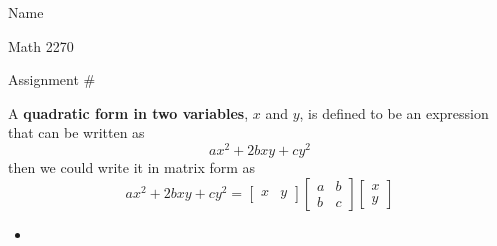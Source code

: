 \documentclass[12pt]{article}
\begin{document}
\hfill Name 

\hfill Math 2270

\hfill Assignment \#

A \textbf{quadratic form in two variables}, $x$ and $y$, is defined to be an expression that can be written as 
\[
ax^2+2bxy+cy^2
\]
then we could write it in matrix form as 
\[
ax^2+2bxy+cy^2=
\begin{bmatrix}
    x&y
\end{bmatrix}
\begin{bmatrix}
    a&b\\
    b&c
\end{bmatrix}
\begin{bmatrix}
    x\\y
\end{bmatrix}
\]

\begin{itemize}

\item [1)]

\end{itemize}
\end{document}
